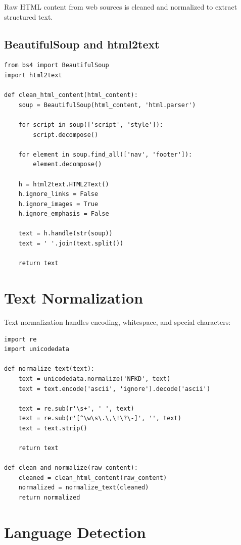 \documentclass[12pt,a4paper]{report}
\begin{document}
Raw HTML content from web sources is cleaned and normalized to extract structured text.

\subsection{BeautifulSoup and html2text}

\begin{lstlisting}
from bs4 import BeautifulSoup
import html2text

def clean_html_content(html_content):
    soup = BeautifulSoup(html_content, 'html.parser')
    
    for script in soup(['script', 'style']):
        script.decompose()
    
    for element in soup.find_all(['nav', 'footer']):
        element.decompose()
    
    h = html2text.HTML2Text()
    h.ignore_links = False
    h.ignore_images = True
    h.ignore_emphasis = False
    
    text = h.handle(str(soup))
    text = ' '.join(text.split())
    
    return text
\end{lstlisting}

\section{Text Normalization}

Text normalization handles encoding, whitespace, and special characters:

\begin{lstlisting}
import re
import unicodedata

def normalize_text(text):
    text = unicodedata.normalize('NFKD', text)
    text = text.encode('ascii', 'ignore').decode('ascii')
    
    text = re.sub(r'\s+', ' ', text)
    text = re.sub(r'[^\w\s\.\,\!\?\-]', '', text)
    text = text.strip()
    
    return text

def clean_and_normalize(raw_content):
    cleaned = clean_html_content(raw_content)
    normalized = normalize_text(cleaned)
    return normalized
\end{lstlisting}

\section{Language Detection}
\end{document}
